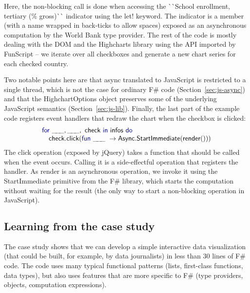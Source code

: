 \documentclass[submission,copyright,creativecommons]{eptcs}
\newcommand{\ignp}{\_\kern-.5ex\_\kern-.5ex\_ }
\newcommand{\kvd}[1]{\textnormal{\textcolor{kvdclr}{\sffamily #1}}}
\newcommand{\ident}[1]{\textnormal{\sffamily #1}}
\newcommand{\lident}[1]{\textnormal{\sffamily
  \`{}\hspace{-0.25em}\`{}\hspace{-0.1em}#1\`{}\hspace{-0.25em}\`{}}}
\begin{document}
Here, the non-blocking call is done when accessing the \lident{School enrollment, tertiary (\% gross)}
indicator using the \kvd{let!} keyword. The indicator is a member (with a name wrapped in
back-ticks to allow spaces) exposed as an asynchronous computation by the World Bank type provider.
The rest of the code is mostly dealing with the DOM and the Highcharts library using the API
imported by FunScript -- we iterate over all checkboxes and generate a new chart series for each
checked country.

Two notable points here are that \ident{async} translated to JavaScript is restricted to a single
thread, which is not the case for ordinary F\# code (Section~\ref{sec:js-async}) and that the
\ident{HighchartOptions} object preserves some of the underlying JavaScript semantics
(Section~\ref{sec:js-lib}). Finally, the last part of the example code registers event handlers that
redraw the chart when the checkbox is clicked:
%
\begin{equation*}
\begin{array}{lll}
 \kvd{for}~\ignp, \ignp,~\ident{check}~\kvd{in}~\ident{infos}~\kvd{do} \\
 \quad \ident{check.click}(\kvd{fun}~\ignp~\rightarrow \ident{Async.StartImmediate}(\ident{render}()))
\end{array}
\end{equation*}
%
The \ident{click} operation (exposed by jQuery) takes a function that should be called when the
event occurs. Calling it is a side-effectful operation that registers the handler. As \ident{render}
is an asynchronous operation, we invoke it using the \ident{StartImmediate} primitive from the
F\# library, which starts the computation without waiting for the result (the only way to start
a non-blocking operation in JavaScript).


\subsection{Learning from the case study}

The case study shows that we can develop a simple interactive data visualization (that could
be built, for example, by data journalists) in less than 30 lines of F\# code. The code uses
many typical functional patterns (lists, first-class functions, data types), but also uses features
that are more specific to F\# (type providers, objects, computation expressions).
\end{document}
